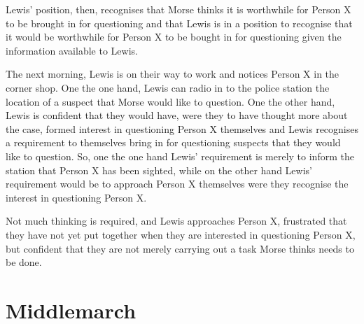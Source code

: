 \documentclass[10pt]{article}
\begin{document}
Lewis' position, then, recognises that Morse thinks it is worthwhile for Person X to be brought in for questioning and that Lewis is in a position to recognise that it would be worthwhile for Person X to be bought in for questioning given the information available to Lewis.

The next morning, Lewis is on their way to work and notices Person X in the corner shop.
One the one hand, Lewis can radio in to the police station the location of a suspect that Morse would like to question.
One the other hand, Lewis is confident that they would have, were they to have thought more about the case, formed interest in questioning Person X themselves and Lewis recognises a requirement to themselves bring in for questioning suspects that they would like to question.
So, one the one hand Lewis' requirement is merely to inform the station that Person X has been sighted, while on the other hand Lewis' requirement would be to approach Person X themselves were they recognise the interest in questioning Person X.

Not much thinking is required, and Lewis approaches Person X, frustrated that they have not yet put together when they are interested in questioning Person X, but confident that they are not merely carrying out a task Morse thinks needs to be done.

\section{Middlemarch}
\label{sec:middlemarch}



\end{document}
